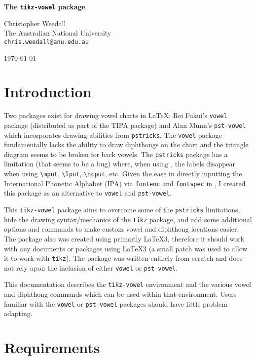 \documentclass{article}
\newcommand{\pkg}[1]{\texttt{#1}}
\begin{document}
\begin{center}
{\Large\bfseries The \pkg{tikz-vowel} package}
\vspace{.5in}

\large Christopher Weedall\\The Australian National University\\\texttt{chris.weedall@anu.edu.au}

\bigskip
\today
\end{center}

\section{Introduction}

Two packages exist for drawing vowel charts in \LaTeX: Rei Fukui's \pkg{vowel} package (distributed as part of the TIPA package) and Alan Munn's \pkg{pst-vowel} which incorporates drawing abilities from \pkg{pstricks}.  The \pkg{vowel} package fundamentally lacks the ability to draw diphthongs on the chart and the triangle diagram seems to be broken for back vowels.  The \pkg{pstricks} package has a limitation (that seems to be a bug) where, when using \XeLaTeX, the labels disappear when using \verb|\mput|, \verb|\lput|, \verb|\ncput|, etc.  Given the ease in directly inputting the International Phonetic Alphabet (IPA) via \pkg{fontenc} and \pkg{fontspec} in \XeLaTeX, I created this package as an alternative to \pkg{vowel} and \pkg{pst-vowel}.

This \pkg{tikz-vowel} package aims to overcome some of the \pkg{pstricks} limitations, hide the drawing syntax/mechanics of the \pkg{tikz} package, and add some additional options and commands to make custom vowel and diphthong locations easier.  The package also was created using primarily \LaTeX3, therefore it should work with any documents or packages using \LaTeX3 (a small patch was used to allow it to work with \pkg{tikz}).  The package was written entirely from scratch and does not rely upon the inclusion of either \pkg{vowel} or \pkg{pst-vowel}.

This documentation describes the \verb|tikz-vowel| environment and the various vowel and diphthong commands which can be used within that environment.  Users familiar with the \pkg{vowel} or \pkg{pst-vowel} packages should have little problem adapting.


\tableofcontents

\section{Requirements}
\label{sec:Requirements}
\end{document}
